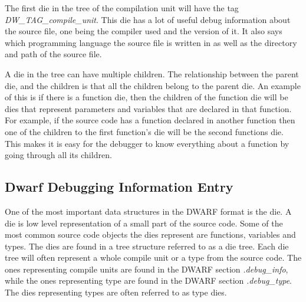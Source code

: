 The first \gls{die} in the tree of the compilation unit will have the tag \emph{DW\_TAG\_compile\_unit}.
This \gls{die} has a lot of useful debug information about the source file, one being the compiler used and the version of it.
It also says which programming language the source file is written in as well as the directory and path of the source file.


A \gls{die} in the tree can have multiple children.
The relationship between the parent \gls{die}, and the children is that all the children belong to the parent \gls{die}.
An example of this is if there is a function \gls{die}, then the children of the function \gls{die} will be \glspl{die} that represent parameters and variables that are declared in that function.
For example, if the source code has a function declared in another function then one of the children to the first function's \gls{die} will be the second functions \gls{die}.
This makes it is easy for the debugger to know everything about a function by going through all its children.



\subsection{Dwarf Debugging Information Entry}
 


One of the most important data structures in the \gls{DWARF} format is the \gls{die}.
A \gls{die} is low level representation of a small part of the source code.
Some of the most common source code objects the \glspl{die} represent are functions, variables and types.
The \glspl{die} are found in a tree structure referred to as a \gls{die} tree.
Each \gls{die} tree will often represent a whole compile unit or a type from the source code.
The ones representing compile units are found in the \gls{DWARF} section \emph{.debug\_info}, while the ones representing type are found in the \gls{DWARF} section \emph{.debug\_type}.
The \glspl{die} representing types are often referred to as type \glspl{die}.


